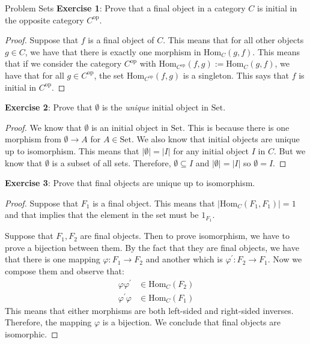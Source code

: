 \documentclass{report}
\begin{document}
\begin{exercises}{Problem Sets}
    \textbf{Exercise 1}: Prove that a final object in a category $C$ is initial in the opposite category $C^{\text{op}}$.
        \begin{proof}
            Suppose that $f$ is a final object of $C$. This means that for all other objects $g \in C$, we have that there is exactly one morphism in $\text{Hom}_{C}(g, f)$. This means that if we consider the category $C^{\text{op}}$ with $\text{Hom}_{C^{\text{op}}}(f, g) := \text{Hom}_{C}(g, f)$, we have that for all $g \in C^{\text{op}}$, the set $\text{Hom}_{C^{\text{op}}}(f, g)$ is a singleton. This says that $f$ is initial in $C^{\text{op}}$.
        \end{proof}

    \textbf{Exercise 2}: Prove that $\emptyset$ is the \textit{unique} initial object in $\text{Set}$.
        \begin{proof}
            We know that $\emptyset$ is an initial object in $\text{Set}$. This is because there is one morphism from $\emptyset \rightarrow A$ for $A \in \text{Set}$. We also know that initial objects are unique up to isomorphism. This means that $\lvert \emptyset \rvert = \lvert I \rvert$ for any initial object $I$ in $C$. But we know that $\emptyset$ is a subset of all sets. Therefore, $\emptyset \subseteq I$ and $\lvert \emptyset \rvert = \lvert I \rvert$ so $\emptyset = I$.
        \end{proof}

    \textbf{Exercise 3}: Prove that final objects are unique up to isomorphism.
        \begin{proof}
            Suppose that $F_{1}$ is a final object. This means that $\lvert \text{Hom}_{C}(F_{1}, F_{1}) \rvert = 1$ and that implies that the element in the set must be $1_{F_{1}}$.

            Suppose that $F_{1}, F_{2}$ are final objects. Then to prove isomorphism, we have to prove a bijection between them. By the fact that they are final objects, we have that there is one mapping $\varphi : F_{1} \rightarrow F_{2}$ and another which is $\varphi^{\prime} : F_{2} \rightarrow F_{1}$. Now we compose them and observe that:
                \begin{align*}
                    \varphi\varphi^{\prime}  &\in  \text{Hom}_{C}(F_{2}) \\
                    \varphi^{\prime}\varphi  &\in  \text{Hom}_{C}(F_{1})   
                \end{align*}
            This means that either morphisms are both left-sided and right-sided inverses. Therefore, the mapping $\varphi$ is a bijection. We conclude that final objects are isomorphic.
        \end{proof}


\end{exercises}
\end{document}
